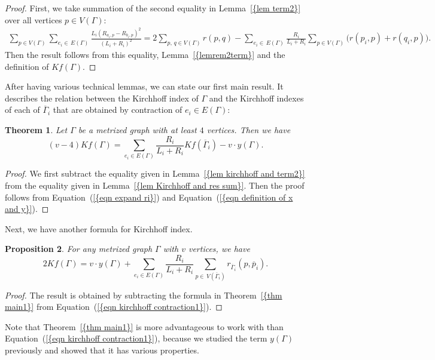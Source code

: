\documentclass[12pt]{amsart}
\newtheorem{theorem}{Theorem}[section]
\newtheorem{proposition}[theorem]{Proposition}
\theoremstyle{example}
\theoremstyle{definition}
\theoremstyle{notation}
\begin{document}
\begin{proof}
First, we take summation of the second equality in {Lemma~\ref{{lem term2}}} over all vertices $p \in {V({\Gamma})}$:
\begin{equation*}\label{eqn kirchhoff and term2a}
\begin{split}
\sum_{p \in {V({\Gamma})}} \sum_{e_i \in \,
{E({\Gamma})}}\frac{{L_{i}}(R_{a_{i},p}-R_{b_{i},p})^2}{({L_{i}}+{R_{i}})^2}
= 2\sum_{p, \, q \in {V({\Gamma})}} r(p,q) -\sum_{e_i \in \,
{E({\Gamma})}}\frac{R_{i}}{{L_{i}} + {R_{i}}} \sum_{p \in {V({\Gamma})}}\big(r({p_{i}},p)+r({q_{i}},p)\big).
\end{split}
\end{equation*}
Then the result follows from this equality, {Lemma~\ref{{lemrem2term}}} and the definition of $Kf({\Gamma})$.
\end{proof}

After having various technical lemmas,  we can state our first
main result. It describes the relation between the Kirchhoff index of ${\Gamma}$ and the Kirchhoff indexes of each
of ${{\overline{\Gamma}}}_i$ that are obtained by contraction of $e_i \in {E({\Gamma})}$:
\begin{theorem}\label{thm main1}
Let ${\Gamma}$ be a metrized graph with at least $4$ vertices. Then we have
$$(v-4)Kf({\Gamma})=\sum_{e_i \in {E({\Gamma})}} \frac{R_{i}}{{L_{i}}+{R_{i}}} Kf({{\overline{\Gamma}}}_i) - v \cdot y({\Gamma}).$$
\end{theorem}
\begin{proof}
 We first subtract the equality given in {Lemma~\ref{{lem kirchhoff and term2}}} from the equality given in {Lemma~\ref{{lem Kirchhoff and res sum}}}.
 Then the proof follows from {Equation~(\ref{{eqn expand ri}})} and {Equation~(\ref{{eqn definition of x and y}})}.
\end{proof}
Next, we have another formula for Kirchhoff index.
\begin{proposition}\label{prop contraction for Kirchhoff}
For any metrized graph ${\Gamma}$ with $v$ vertices, we have
$$2Kf({\Gamma})= v \cdot y({\Gamma})+\sum_{e_i \in {E({\Gamma})}} \frac{R_{i}}{{L_{i}}+{R_{i}}}\sum_{p \in \, {V({{{\overline{\Gamma}}}_i})}} r_{{{\overline{\Gamma}}}_i}(p,{\overline{p}_i}).$$
\end{proposition}
\begin{proof}
The result is obtained by subtracting the formula in {Theorem~\ref{{thm main1}}} from {Equation~(\ref{{eqn kirchhoff contraction1}})}.
\end{proof}
Note that {Theorem~\ref{{thm main1}}} is more advantageous to work with than {Equation~(\ref{{eqn kirchhoff contraction1}})}, because we studied the term $y({\Gamma})$ previously \cite{C5} and showed that it has various properties.
\end{document}
